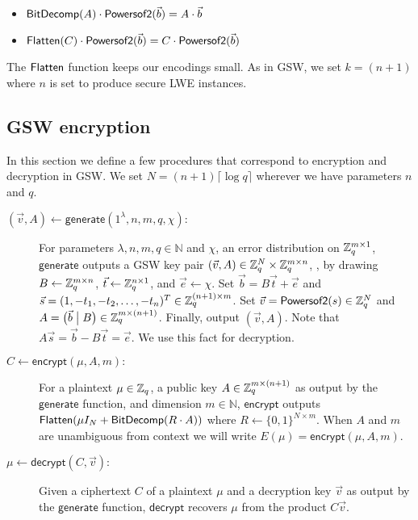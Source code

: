 \begin{itemize}
\item $\mathsf{BitDecomp}(A)\cdot\mathsf{Powersof2}(\vec{b}) = A\cdot\vec{b}$
\item $\mathsf{Flatten}(C)\cdot\mathsf{Powersof2}(\vec{b}) = C\cdot\mathsf{Powersof2}(\vec{b})$
\end{itemize}

The $\mathsf{Flatten}$ function keeps our encodings small.  As in GSW, we set $k = (n+1)$ where $n$ is set to produce secure LWE instances.

\subsection{GSW encryption}

In this section we define a few procedures that correspond to encryption and decryption in GSW.  We set $N = (n+1)\lceil \log q\rceil$ wherever we have parameters $n$ and $q$.

\begin{description}

\item[$(\vec{v}, A) \leftarrow \mathsf{generate}(1^\lambda, n, m, q, \chi):$] For parameters $\lambda, n, m, q \in \mathbb{N}$ and $\chi$, an error distribution on $\mathbb{Z}_q^{m\times 1}$, $\mathsf{generate}$ outputs a GSW key pair $(\vec{v},A) \in \mathbb{Z}_q^N \times \mathbb{Z}_q^{m \times n}$, , by drawing $B \leftarrow \mathbb{Z}_q^{m\times n}$, $\vec{t} \leftarrow \mathbb{Z}_q^{n \times 1}$, and $\vec{e}\leftarrow \chi$.  Set $\vec{b} = B\vec{t} + \vec{e}$ and $\vec{s} = (1, -t_1, -t_2, \ldots, -t_n)^T \in \mathbb{Z}_q^{(n+1)\times m}$.  Set $\vec{v} = \mathsf{Powersof2}(s) \in \mathbb{Z}_q^N$ and $A = \big(\vec{b} \; \big| \; B\big) \in \mathbb{Z}_q^{m \times (n+1)}$.  Finally, output $(\vec{v}, A)$.  Note that $A\vec{s} = \vec{b} - B\vec{t} = \vec{e}$.  We use this fact for decryption.

\item[$C \leftarrow \mathsf{encrypt}(\mu, A,m):$]  For a plaintext $\mu \in \mathbb{Z}_q$, a public key $A \in \mathbb{Z}_q^{m \times (n+1)}$ as output by the $\mathsf{generate}$ function, and dimension $m \in \mathbb{N}$, $\mathsf{encrypt}$ outputs $\mathsf{Flatten}(\mu I_N + \mathsf{BitDecomp}(R\cdot A))$ where $R \leftarrow \{0,1\}^{N\times m}$.  When $A$ and $m$ are unambiguous from context we will write $E(\mu) = \mathsf{encrypt}(\mu, A, m)$.

\item[$\mu \leftarrow \mathsf{decrypt}(C, \vec{v}):$]  Given a ciphertext $C$ of a plaintext $\mu$ and a decryption key $\vec{v}$ as output by the $\mathsf{generate}$ function, $\mathsf{decrypt}$ recovers $\mu$ from the product $C\vec{v}$.  
\end{description}

